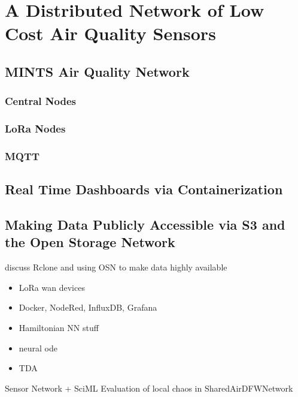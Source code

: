 \chapter{A Distributed Network of Low Cost Air Quality Sensors}

\section{MINTS Air Quality Network}
\subsection{Central Nodes}
\subsection{LoRa Nodes}
\subsection{MQTT}

\section{Real Time Dashboards via Containerization}

\section{Making Data Publicly Accessible via S3 and the Open Storage Network}
discuss Rclone and using OSN to make data highly available


\begin{itemize}
\item LoRa wan devices
\item Docker, NodeRed, InfluxDB, Grafana
\item Hamiltonian NN stuff
\item neural ode
\item TDA
\end{itemize}

Sensor Network + SciML
Evaluation of local chaos in SharedAirDFWNetwork

